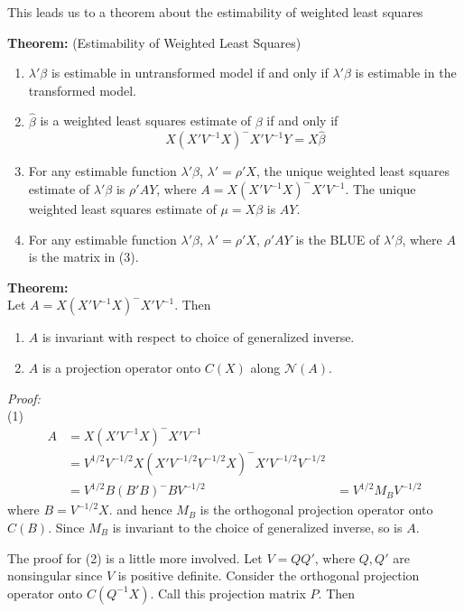 \documentclass[12pt]{article}
\newcommand{\bhat}{\hat{\beta}}
\numberwithin{equation}{section}
\begin{document}
This leads us to a theorem about the estimability of weighted least squares

\textbf{Theorem:} (Estimability of Weighted Least Squares) \\
\begin{enumerate}
  \item $\lambda'\beta$ is estimable in untransformed model if and only if $\lambda ' \beta$ is estimable in the transformed model.
  \item $\bhat$ is a weighted least squares estimate of $\beta$ if and only if
  \begin{equation*}
    X(X'V^{-1}X)^{-}X'V^{-1}Y = X\bhat
  \end{equation*}
  \item For any estimable function $\lambda' \beta$, $\lambda' = \rho'X$, the unique weighted least squares estimate of $\lambda'\beta$ is $\rho'AY$, where $A = X(X'V^{-1}X)^{-}X'V^{-1}$. The unique weighted least squares estimate of $\mu = X\beta$ is $AY$.
  \item For any estimable function $\lambda'\beta$, $\lambda' = \rho'X$, $\rho'AY$ is the BLUE of $\lambda'\beta$, where $A$ is the matrix in (3).
\end{enumerate}

\textbf{Theorem:} \\
Let $A = X(X'V^{-1}X)^{-}X'V^{-1}$. Then
\begin{enumerate}
  \item $A$ is invariant with respect to choice of generalized inverse.
  \item $A$ is a projection operator onto $C(X)$ along $\mathcal{N}(A)$.
\end{enumerate}

\textit{Proof:} \\
(1) 
\begin{align*}
  A &= X(X'V^{-1}X)^{-}X'V^{-1} \\
    &= V^{1/2} V^{-1/2} X(X'V^{-1/2}V^{-1/2}X)^{-} X'V^{-1/2}V^{-1/2} \\
    &= V^{1/2}B(B'B)^{-}BV^{-1/2}
    &= V^{1/2} M_B V^{-1/2}
\end{align*}
where $B = V^{-1/2}X$. and hence $M_B$ is the orthogonal projection operator onto $C(B)$. Since $M_B$ is invariant to the choice of generalized inverse, so is $A$.

The proof for (2) is a little more involved. Let $V = QQ'$, where $Q, Q'$ are nonsingular since $V$ is positive definite. Consider the orthogonal projection operator onto $C(Q^{-1}X)$. Call this projection matrix $P$. Then
\end{document}
